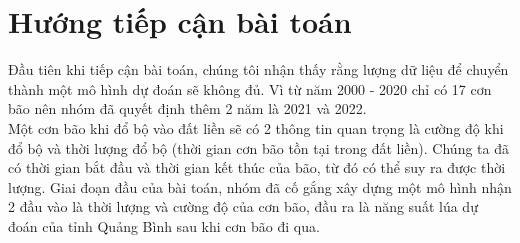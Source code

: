 \documentclass[12pt]{report}
\begin{document}
\section{Hướng tiếp cận bài toán} %
\label{sec:hướng_tiếp_cận_bài_toán}
\begin{flushleft}
	Đầu tiên khi tiếp cận bài toán, chúng tôi nhận thấy rằng lượng dữ liệu để chuyển thành một mô hình dự đoán sẽ không đủ. Vì từ năm 2000 - 2020 chỉ có 17 cơn bão nên nhóm đã quyết định thêm 2 năm là 2021 và 2022.
	\\[\baselineskip]

	Một cơn bão khi đổ bộ vào đất liền sẽ có 2 thông tin quan trọng là cường độ khi đổ bộ và thời lượng đổ bộ (thời gian cơn bão tồn tại trong đất liền). Chúng ta đã có thời gian bắt đầu và thời gian kết thúc của bão, từ đó có thể suy ra được thời lượng. Giai đoạn đầu của bài toán, nhóm đã cố gắng xây dựng một mô hình nhận 2 đầu vào là thời lượng và cường độ của cơn bão, đầu ra là năng suất lúa dự đoán của tỉnh Quảng Bình sau khi cơn bão đi qua.
\end{flushleft}
\end{document}
